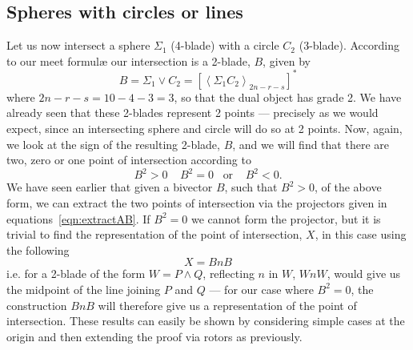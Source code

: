 %
%

\subsection{Spheres with circles or lines}

Let us now intersect a sphere $\Sigma_1$ (4-blade) with a
circle $C_2$ (3-blade). According to our meet formul\ae
our intersection is a 2-blade, $B$, given by
%
\begin{equation}
B = \Sigma_1 \vee C_2 = \left[\left< \Sigma_1 C_2
\right>_{2n-r-s}\right]^*
\end{equation}
%
where $2n-r-s=10-4-3=3$, so that the dual object has
grade 2. We have already seen that these 2-blades
represent 2 points --- precisely as we would expect, since
an intersecting sphere and circle will do so at 2 points.
Now, again, we look at the sign of the resulting 2-blade,
$B$, and we will find that there are two, zero or one
point of intersection according to
%
\[  B^2>0 \;\;\;\; B^2=0 \;\;\;\mbox{or}\;\;\;\; B^2<0.
\]
%
We have seen earlier that given a bivector $B$, such that
$B^2>0$, of the above form, we can extract the two points
of intersection via the projectors given in
equations~\ref{eqn:extractAB}. If $B^2=0$ we cannot form
the projector, but it is trivial to find the representation of the point of
intersection, $X$, in this case using the following
%
\[  X = BnB  \]
%
i.e. for a 2-blade of the form $W = P\wedge Q$, reflecting
$n$ in $W$, $WnW$, would give us the midpoint of the line
joining $P$ and $Q$ --- for our case where $B^2=0$, the
construction $BnB$ will therefore give us a representation of the point of
intersection. These results can easily be shown by
considering simple cases at the origin and then extending
the proof via rotors as previously.

